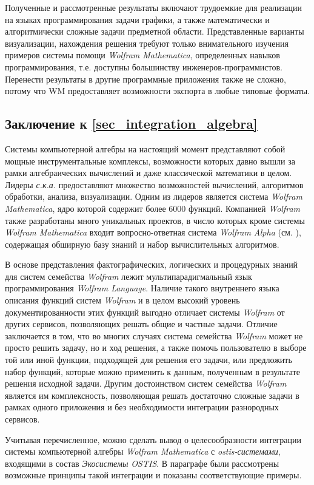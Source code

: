 Полученные и рассмотренные результаты включают трудоемкие для реализации на языках программирования задачи графики, а также математически и алгоритмически сложные задачи предметной области. Представленные варианты визуализации, нахождения решения требуют только внимательного изучения примеров системы помощи \textit{Wolfram Mathematica}, определенных навыков программирования, т.е. доступны большинству инженеров-программистов. Перенести результаты в другие программные приложения также не сложно, потому что WM предоставляет возможности экспорта в любые типовые форматы.

\subsection*{Заключение к \ref{sec_integration_algebra}}

Системы компьютерной алгебры на настоящий момент представляют собой мощные инструментальные комплексы, возможности которых давно вышли за рамки алгебраических вычислений и даже классической математики в целом. Лидеры \textit{с.к.а.} предоставляют множество возможностей вычислений, алгоритмов обработки, анализа, визуализации. Одним из лидеров является система \textit{Wolfram Mathematica}, ядро которой содержит более 6000 функций. Компанией \textit{Wolfram} также разработаны много уникальных проектов, в число которых кроме системы \textit{Wolfram Mathematica} входит вопросно-ответная система \textit{Wolfram Alpha} (см. ), содержащая обширную базу знаний и набор вычислительных алгоритмов. 

В основе представления фактографических, логических и процедурных знаний для систем семейства \textit{Wolfram} лежит мультипарадигмальный язык программирования \textit{Wolfram Language}. Наличие такого внутреннего языка описания функций систем \textit{Wolfram} и в целом высокий уровень документированности этих функций выгодно отличает системы \textit{Wolfram} от других сервисов, позволяющих решать общие и частные задачи. Отличие заключается в том, что во многих случаях система семейства \textit{Wolfram} может не просто решить задачу, но и  ход решения, а также помочь пользователю в выборе той или иной функции, подходящей для решения его задачи, или предложить набор функций, которые можно применить к данным, полученным в результате решения исходной задачи. Другим достоинством систем семейства \textit{Wolfram} является им комплексность, позволяющая решать достаточно сложные задачи в рамках одного приложения и без необходимости интеграции разнородных сервисов.

Учитывая перечисленное, можно сделать вывод о целесообразности интеграции системы компьютерной алгебры \textit{Wolfram Mathematica} с \textit{ostis-системами}, входящими в состав \textit{Экосистемы OSTIS}. В параграфе были рассмотрены возможные принципы такой интеграции и показаны соответствующие примеры.